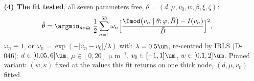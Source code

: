 \medskip
\textbf{(4) The fit tested}, all seven parameters free, $\theta=(d,\mu,v_0,w,\beta,\xi,\zeta)$:
\begin{equation*}
\hat\theta=\argmin_{\theta\in\Theta}\ \frac12\sum_{n=1}^{53}\omega_n\Bigl[\frac{\Imod\bigl(v_n\mid\theta;\varphi,\bar B\bigr)-I(v_n)}{\bar B}\Bigr]^{2},
\end{equation*}
$\omega_n\equiv1$, or $\omega_n=\exp(-\lvert v_n-v_0\rvert/\lambda)$ with $\lambda=0.5\um$, re-centred by IRLS (D-046); $d\in[0.05,6]\um$, $\mu\in[0,20]\,\upmu\mathrm{m}^{-1}$, $v_0\in[-1,1]\um$, $w\in[0.1,2]\um$. Pinned variant: $(w,\kappa)$ fixed at the values this fit returns on one thick node, $(d,\mu,v_0)$ fitted.
